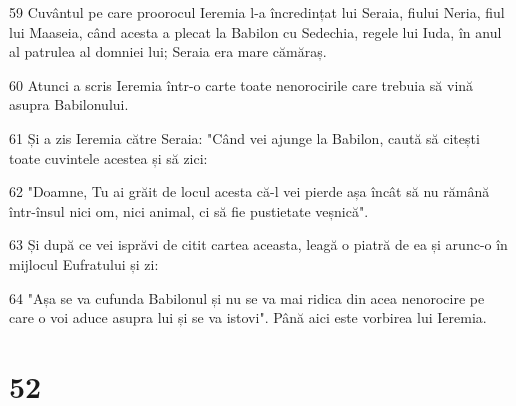 \par 59 Cuvântul pe care proorocul Ieremia l-a încredințat lui Seraia, fiului Neria, fiul lui Maaseia, când acesta a plecat la Babilon cu Sedechia, regele lui Iuda, în anul al patrulea al domniei lui; Seraia era mare cămăraș.
\par 60 Atunci a scris Ieremia într-o carte toate nenorocirile care trebuia să vină asupra Babilonului.
\par 61 Și a zis Ieremia către Seraia: "Când vei ajunge la Babilon, caută să citești toate cuvintele acestea și să zici:
\par 62 "Doamne, Tu ai grăit de locul acesta că-l vei pierde așa încât să nu rămână într-însul nici om, nici animal, ci să fie pustietate veșnică".
\par 63 Și după ce vei isprăvi de citit cartea aceasta, leagă o piatră de ea și arunc-o în mijlocul Eufratului și zi:
\par 64 "Așa se va cufunda Babilonul și nu se va mai ridica din acea nenorocire pe care o voi aduce asupra lui și se va istovi". Până aici este vorbirea lui Ieremia.

\chapter{52}

